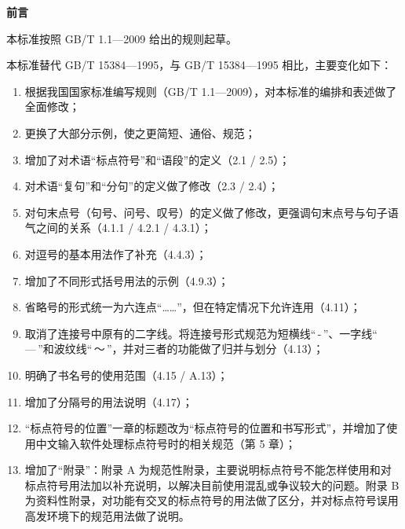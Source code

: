 \documentclass[a4paper]{article}
\begin{document}
\begin{multicols}{2}
    \tableofcontents
\end{multicols}

\thispagestyle{empty}


\newpage


\begin{center}
    \Large{\textbf{前\hspace{2em}言}}
\end{center}
\vspace{0.5cm}

{本标准按照 GB/T 1.1—2009 给出的规则起草。}

{本标准替代 GB/T 15384—1995，与 GB/T 15384—1995 相比，主要变化如下：}

\begin{enumerate}[label=——,labelsep=0pt,left=0em, align=left,topsep=1pt,parsep=1pt]
    \item 根据我国国家标准编写规则（GB/T 1.1—2009），对本标准的编排和表述做了全面修改；
    \item 更换了大部分示例，使之更简短、通俗、规范；
    \item 增加了对术语“标点符号”和“语段”的定义（2.1 / 2.5）；
    \item 对术语“复句”和“分句”的定义做了修改（2.3 / 2.4）；
    \item 对句末点号（句号、问号、叹号）的定义做了修改，更强调句末点号与句子语气之间的关系（4.1.1 / 4.2.1 / 4.3.1）；
    \item 对逗号的基本用法作了补充（4.4.3）；
    \item 增加了不同形式括号用法的示例（4.9.3）；
    \item 省略号的形式统一为六连点“……”，但在特定情况下允许连用（4.11）；
    \item 取消了连接号中原有的二字线。将连接号形式规范为短横线“\,-\,”、一字线“\,—\,”和波纹线“\,～\,”，并对三者的功能做了归并与划分（4.13）；
    \item 明确了书名号的使用范围（4.15 / A.13）；
    \item 增加了分隔号的用法说明（4.17）；
    \item \;“标点符号的位置”一章的标题改为“标点符号的位置和书写形式”，并增加了使用中文输入软件处理标点符号时的相关规范（第 5 章）；
    \item 增加了“附录”：附录 A 为规范性附录，主要说明标点符号不能怎样使用和对标点符号用法加以补充说明，以解决目前使用混乱或争议较大的问题。附录 B 为资料性附录，对功能有交叉的标点符号的用法做了区分，并对标点符号误用高发环境下的规范用法做了说明。
\end{enumerate}
\end{document}
